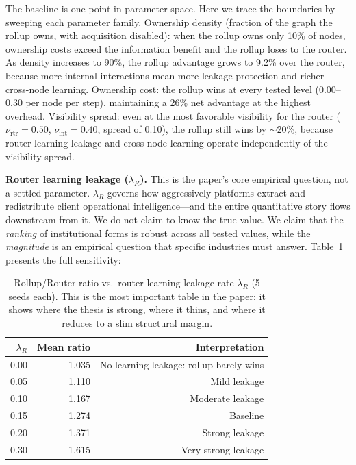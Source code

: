 \documentclass[12pt]{article}
\theoremstyle{definition}
\begin{document}
The baseline is one point in parameter space. Here we trace the boundaries by sweeping each parameter family. Ownership density (fraction of the graph the rollup owns, with acquisition disabled): when the rollup owns only 10\% of nodes, ownership costs exceed the information benefit and the rollup loses to the router. As density increases to 90\%, the rollup advantage grows to 9.2\% over the router, because more internal interactions mean more leakage protection and richer cross-node learning. Ownership cost: the rollup wins at every tested level (0.00--0.30 per node per step), maintaining a 26\% net advantage at the highest overhead. Visibility spread: even at the most favorable visibility for the router ($\nu_{\text{rtr}} = 0.50$, $\nu_{\text{int}} = 0.40$, spread of 0.10), the rollup still wins by $\sim$20\%, because router learning leakage and cross-node learning operate independently of the visibility spread.

\textbf{Router learning leakage ($\lambda_R$).} This is the paper's core empirical question, not a settled parameter. $\lambda_R$ governs how aggressively platforms extract and redistribute client operational intelligence---and the entire quantitative story flows downstream from it. We do not claim to know the true value. We claim that the \textit{ranking} of institutional forms is robust across all tested values, while the \textit{magnitude} is an empirical question that specific industries must answer. Table~\ref{tab:lr_sensitivity} presents the full sensitivity:

\begin{table}[H]
\centering
\caption{Rollup/Router ratio vs.\ router learning leakage rate $\lambda_R$ (5 seeds each). This is the most important table in the paper: it shows where the thesis is strong, where it thins, and where it reduces to a slim structural margin.}
\label{tab:lr_sensitivity}
\begin{tabular}{rrr}
\toprule
$\lambda_R$ & Mean ratio & Interpretation \\
\midrule
0.00 & 1.035 & No learning leakage: rollup barely wins \\
0.05 & 1.110 & Mild leakage \\
0.10 & 1.167 & Moderate leakage \\
0.15 & 1.274 & Baseline \\
0.20 & 1.371 & Strong leakage \\
0.30 & 1.615 & Very strong leakage \\
\bottomrule
\end{tabular}
\end{table}
\end{document}
